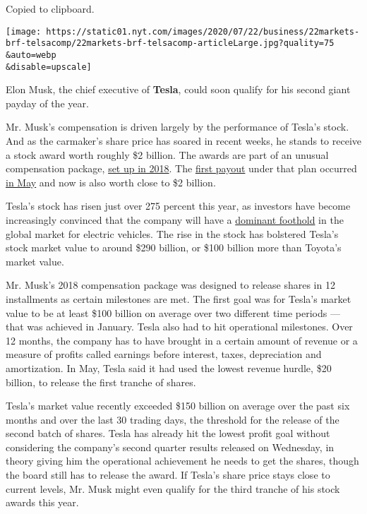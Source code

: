 Copied to clipboard.

\texttt{[image: https://static01.nyt.com/images/2020/07/22/business/22markets-brf-telsacomp/22markets-brf-telsacomp-articleLarge.jpg?quality=75\\\&auto=webp\\\&disable=upscale]}

Elon Musk, the chief executive of \textbf{Tesla}, could soon qualify for
his second giant payday of the year.

Mr. Musk's compensation is driven largely by the performance of Tesla's
stock. And as the carmaker's share price has soared in recent weeks, he
stands to receive a stock award worth roughly \$2 billion. The awards
are part of an unusual compensation package,
\href{https://www.nytimes.com/2018/01/23/business/dealbook/tesla-elon-musk-pay.html}{set
up in 2018}. The
\href{https://www.nytimes.com/2020/01/22/business/elon-musk-tesla-bonus.html}{first
payout} under that plan occurred
\href{https://www.sec.gov/Archives/edgar/data/1318605/000156459020027321/tsla-def14a_20200707.htm}{in
May} and now is also worth close to \$2 billion.

Tesla's stock has risen just over 275 percent this year, as investors
have become increasingly convinced that the company will have a
\href{https://www.nytimes.com/2020/07/22/business/tesla-electric-car-audi-polestar.html}{dominant
foothold} in the global market for electric vehicles. The rise in the
stock has bolstered Tesla's stock market value to around \$290 billion,
or \$100 billion more than Toyota's market value.

Mr. Musk's 2018 compensation package was designed to release shares in
12 installments as certain milestones are met. The first goal was for
Tesla's market value to be at least \$100 billion on average over two
different time periods --- that was achieved in January. Tesla also had
to hit operational milestones. Over 12 months, the company has to have
brought in a certain amount of revenue or a measure of profits called
earnings before interest, taxes, depreciation and amortization. In May,
Tesla said it had used the lowest revenue hurdle, \$20 billion, to
release the first tranche of shares.

Tesla's market value recently exceeded \$150 billion on average over the
past six months and over the last 30 trading days, the threshold for the
release of the second batch of shares. Tesla has already hit the lowest
profit goal without considering the company's second quarter results
released on Wednesday, in theory giving him the operational achievement
he needs to get the shares, though the board still has to release the
award. If Tesla's share price stays close to current levels, Mr. Musk
might even qualify for the third tranche of his stock awards this year.

